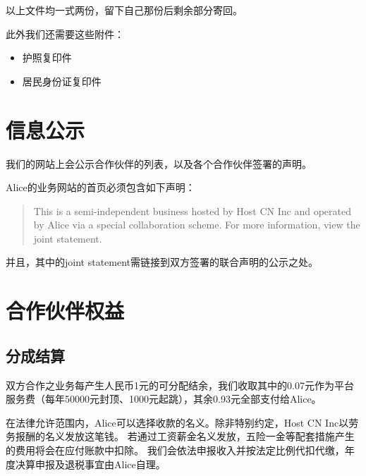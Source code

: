 \documentclass[a4paper,12pt]{report}
\begin{document}
以上文件均一式两份，留下自己那份后剩余部分寄回。

此外我们还需要这些附件：
\begin{itemize}
    \item 护照复印件
    \item 居民身份证复印件
\end{itemize}


















\chapter{信息公示}
我们的网站上会公示合作伙伴的列表，以及各个合作伙伴签署的声明。

Alice的业务网站的首页必须包含如下声明：

\begin{quote}
	This is a semi-independent business hosted by Host CN Inc and operated by Alice
	via a special collaboration scheme.
	For more information, view the joint statement.
\end{quote}

并且，其中的joint statement需链接到双方签署的联合声明的公示之处。

















\chapter{合作伙伴权益}
\section{分成结算}
双方合作之业务每产生人民币1元的可分配结余，我们收取其中的0.07元作为平台服务费（每年50000元封顶、1000元起跳），其余0.93元全部支付给Alice。

在法律允许范围内，Alice可以选择收款的名义。除非特别约定，Host CN Inc以劳务报酬的名义发放这笔钱。
若通过工资薪金名义发放，五险一金等配套措施产生的费用将会在应付账款中扣除。
我们会依法申报收入并按法定比例代扣代缴，年度决算申报及退税事宜由Alice自理。
\end{document}

